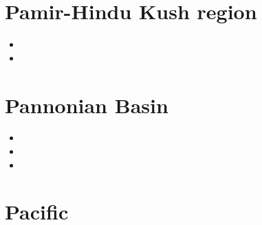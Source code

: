 
\section{Pamir-Hindu Kush region}

\begin{small}
\begin{itemize}
\item[\twothousandseven]
\item[\twothousandsixteen]
\end{itemize}
\end{small}

\section{Pannonian Basin}

\begin{small}
\begin{itemize}
\item[\twothousandone]
\item[\twothousandtwo]
\item[\twothousandtwentyone]
\end{itemize}
\end{small}

\section{Pacific}

